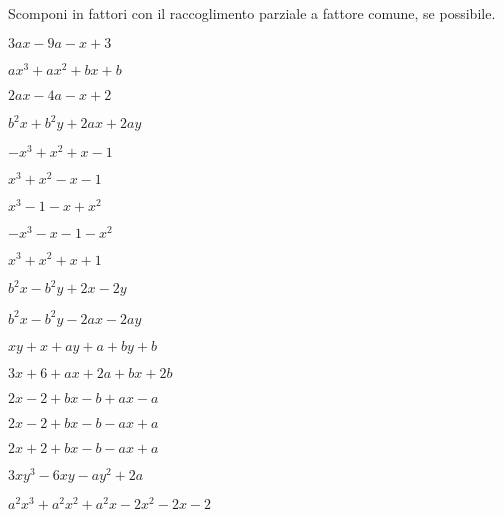 \begin{esercizio}
\label{ese:div.014}
Scomponi in fattori con il raccoglimento parziale a fattore comune, se 
possibile.
\begin{htmulticols}{2}
\begin{enumeratea}
\item \(3ax-9a-x+3\)
\item \(ax^{3}+ax^{2}+bx+b\)
\item \(2ax-4a-x+2\)
\item \(b^{2}x+b^{2}y+2ax+2ay\)
\item \(-x^{3}+x^{2}+x-1\)
\item \(x^{3}+x^{2}-x-1\)
\item \(x^{3}-1-x+x^{2}\)
\item \(-x^{3}-x-1-x^{2}\)
\item \(x^{3}+x^{2}+x+1\)
\item \(b^{2}x-b^{2}y+2x-2y\)
\item \(b^{2}x-b^{2}y-2ax-2ay\)
\item \(xy+x+ay+a+by+b\)
\item \(3x+6+ax+2a+bx+2b\)
\item \(2x-2+bx-b+ax-a\)
\item \(2x-2+bx-b-ax+a\)
\item \(2x+2+bx-b-ax+a\)
 \item \(3xy^{3}-6xy-ay^{2}+2a\)
 \item \(a^{2}x^{3}+a^{2}x^{2}+a^{2}x-2x^{2}-2x-2\)
\end{enumeratea}
\end{htmulticols}
\end{esercizio}
% 

